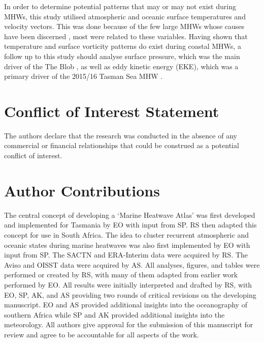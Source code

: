 \documentclass[utf8]{frontiersSCNS}
\begin{document}
In order to determine potential patterns that may or may not exist during MHWs, this study utilised atmospheric and oceanic surface temperatures and velocity vectors. This was done because of the few large MHWs whose causes have been discerned \citep[e.g.][]{Garrabou2009, Feng2013, Pearce2013, Benthuysen2014, Chen2015a, Oliver2017}, most were related to these variables. Having shown that temperature and surface vorticity patterns do exist during coastal MHWs, a follow up to this study should analyse surface pressure, which was the main driver of the The Blob \citep{Bond2015a}, as well as eddy kinetic energy (EKE), which was a primary driver of the 2015/16 Tasman Sea MHW \citep{Oliver2017}.


\section*{Conflict of Interest Statement}
The authors declare that the research was conducted in the absence of any commercial or financial relationships that could be construed as a potential conflict of interest.


\section*{Author Contributions}
The central concept of developing a `Marine Heatwave Atlas' was first developed and implemented for Tasmania by EO with input from SP. RS then adapted this concept for use in South Africa. The idea to cluster recurrent atmospheric and oceanic states during marine heatwaves was also first implemented by EO with input from SP. The SACTN and ERA-Interim data were acquired by RS. The Aviso and OISST data were acquired by AS. All analyses, figures, and tables were performed or created by RS, with many of them adapted from earlier work performed by EO. All results were initially interpreted and drafted by RS, with EO, SP, AK, and AS providing two rounds of critical revisions on the developing manuscript. EO and AS provided additional insights into the oceanography of southern Africa while SP and AK provided additional insights into the meteorology. All authors give approval for the submission of this manuscript for review and agree to be accountable for all aspects of the work.
\end{document}
